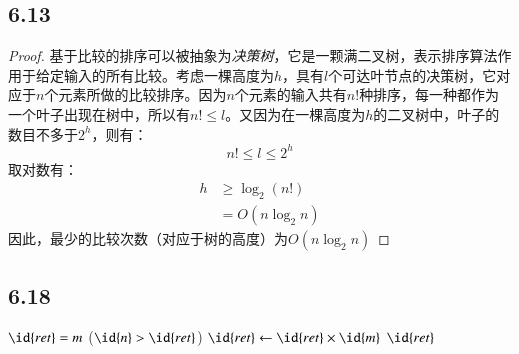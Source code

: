 \documentclass[twocolumn]{article}
\begin{document}
	\subsection*{6.13}
	\begin{proof}
		基于比较的排序可以被抽象为\emph{决策树}，它是一颗满二叉树，表示排序算法作用于给定输入的所有比较。考虑一棵高度为$h$，具有$l$个可达叶节点的决策树，它对应于$n$个元素所做的比较排序。因为$n$个元素的输入共有$n!$种排序，每一种都作为一个叶子出现在树中，所以有$n!\le l$。又因为在一棵高度为$h$的二叉树中，叶子的数目不多于$2^h$，则有：
		\[
		n!\le l\le 2^h
		\]
		取对数有：
		\[
		\begin{aligned}
			h&\ge \log_2(n!)\\
			&=O(n\log_2 n)
		\end{aligned}
		\]
		因此，最少的比较次数（对应于树的高度）为$O(n\log_2 n)$
	\end{proof}
	\subsection*{6.18}
	\begin{codebox}
		\zi {} \li
		$\id{ret}=m$\li 
		\While ($\id{n}>\id{ret}$)\Do\li 
		$\id{ret}\gets \id{ret}\times \id{m}$\End\li 
		\Return $\id{ret}$
	\end{codebox}
\end{document}
